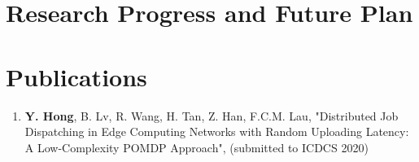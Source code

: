 \section{Research Progress and Future Plan}

\section{Publications}
\begin{enumerate}
    \item \textbf{Y. Hong}, {B. Lv}, {R. Wang}, {H. Tan}, {Z. Han}, {F.C.M. Lau}, "Distributed Job Dispatching in Edge Computing Networks with Random Uploading Latency: A Low-Complexity POMDP Approach", (submitted to ICDCS 2020)
\end{enumerate}